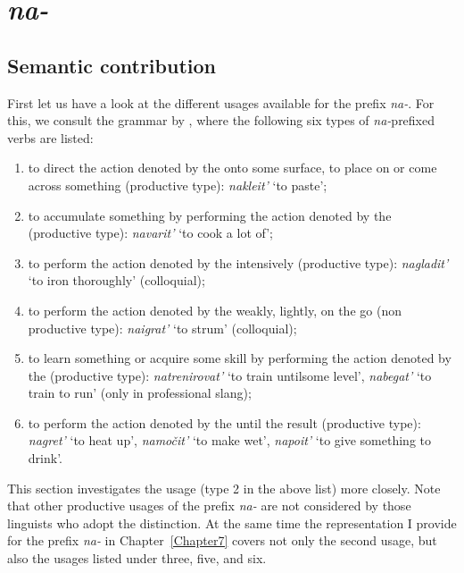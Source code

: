 \section{\textit{na-}}\label{subsection:semantics:na}
\subsection{Semantic contribution}
First let us have a look at the different usages available for the prefix \textit{na-}. For this, we consult the grammar by \citet[360]{Shvedova:82}, where the following six types of \textit{na-}prefixed verbs are listed:
\begin{enumerate}
\item to direct the action denoted by the  onto some surface, to place on or come across something (productive type): \textit{nakleit'} `to paste';
\item to accumulate something by performing the action denoted by the  (productive type): \textit{navarit'} `to cook a lot of';
\item to perform the action denoted by the  intensively (productive type): \textit{nagladit'} `to iron thoroughly' (colloquial);
\item to perform the action denoted by the  weakly, lightly, on the go (non productive type): \textit{naigrat'} `to strum' (colloquial);
\item to learn something or acquire some skill by performing the action denoted by the  (productive type): \textit{natrenirovat'} `to train until\linebreak some level', \textit{nabegat'} `to train to run' (only in professional slang);
\item to perform the action denoted by the  until the result (productive type): \textit{nagret'} `to heat up', \textit{namo\v{c}it'} `to make wet', \textit{napoit'} `to give something to drink'.
\end{enumerate}

This section investigates the  usage (type 2 in the above list) more closely. Note that other productive usages of the prefix \textit{na-} are not considered  by those linguists who adopt the distinction. At the same time the representation I provide for the prefix \textit{na-} in Chapter~\ref{Chapter7} covers not only the second usage, but also the usages listed under three, five, and six.


